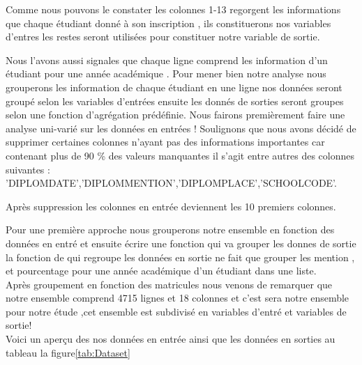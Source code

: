  Comme nous pouvons le constater les colonnes 1-13 regorgent les informations que chaque étudiant donné à son inscription , ils constituerons nos variables d'entres les restes seront utilisées pour constituer notre variable de sortie.

Nous l'avons aussi signales que chaque ligne comprend les information
d'un étudiant pour une année académique . Pour mener bien notre analyse nous grouperons  les information de chaque étudiant en une ligne nos données seront groupé selon les variables d'entrées ensuite les donnés de sorties seront groupes selon une fonction d'agrégation prédéfinie.
Nous fairons premièrement faire une analyse uni-varié  sur les données en entrées !
Soulignons que nous avons décidé de supprimer certaines colonnes n'ayant pas des informations importantes car contenant plus de 90 \% des valeurs manquantes il s'agit entre autres des colonnes suivantes :
'DIPLOMDATE','DIPLOMMENTION','DIPLOMPLACE','SCHOOLCODE'.

Après suppression les colonnes en entrée deviennent les 10 premiers colonnes.

Pour une première approche nous grouperons  notre ensemble en fonction des données en entré et ensuite écrire une fonction qui va grouper les donnes de sortie la fonction de qui regroupe les données en sortie ne fait que grouper les mention , et pourcentage pour une année académique d'un étudiant dans une liste.\\ 
Après groupement en fonction des matricules nous venons de remarquer que
notre ensemble comprend 4715 lignes et 18 colonnes et c'est sera notre ensemble pour notre étude ,cet ensemble est subdivisé en variables d'entré et variables de
sortie!\\
Voici un aperçu des nos données en entrée ainsi que les données en sorties  au tableau la figure\ref{tab:Dataset}
